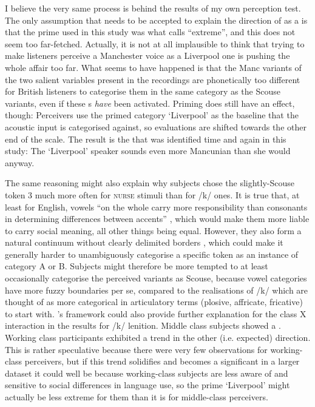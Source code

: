 \newpage 
I believe the very same process is behind the results of my own perception test.
The only assumption that needs to be accepted to explain the direction of  as a  is that the prime used in this study was what \citeauthor{herr1986} calls ``extreme'', and this does not seem too far-fetched.
Actually, it is not at all implausible to think that trying to make listeners perceive a Manchester voice as a Liverpool one is pushing the whole affair too far.
What seems to have happened is that the Manc variants of the two salient variables present in the recordings are phonetically too different for British listeners to categorise them in the same category as the Scouse variants, even if these s \emph{have} been activated.
Priming does still have an effect, though: Perceivers use the primed category `Liverpool' as the baseline that the acoustic input is categorised against, so evaluations are shifted towards the other end of the scale.
The result is the  that was identified time and again in this study: The `Liverpool' speaker sounds even more Mancunian than she would anyway.

The same reasoning might also explain why subjects chose the slightly-Scouse token 3 much more often for \textsc{nurse} stimuli than for /k/ ones.
It is true that, at least for English, vowels ``on the whole carry more responsibility than consonants in determining differences between accents'' \parencite[12]{foulkesdocherty1999a}, which would make them more liable to carry social meaning, all other things being equal.
However, they also form a natural continuum without clearly delimited borders \parencite[cf.][12]{foulkesdocherty1999a}, which could make it generally harder to unambiguously categorise a specific token as an instance of category A or B.
Subjects might therefore be more tempted to at least occasionally categorise the perceived variants as Scouse, because vowel categories have more fuzzy boundaries per se, compared to the realisations of /k/ which are thought of as more categorical in articulatory terms (plosive, affricate, fricative) to start with.
\citeauthor{herr1986}'s framework could also provide further explanation for the class X  interaction in the results for /k/ lenition.
Middle class subjects showed a .
Working class participants exhibited a trend in the other (i.e. expected) direction.
This is rather speculative because there were very few observations for working-class perceivers, but if this trend solidifies and becomes a significant  in a larger dataset it could well be because working-class subjects are less aware of and sensitive to social differences in language use, so the prime `Liverpool' might actually be less extreme for them than it is for middle-class perceivers.

